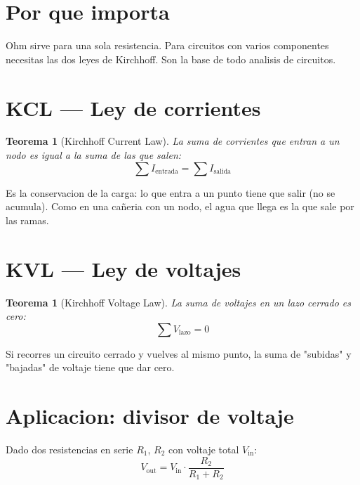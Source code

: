\documentclass[11pt,a4paper,oneside,openright]{book}
\newtheorem{teorema}[definicion]{Teorema}
\begin{document}
\section{Por que importa}

Ohm sirve para una sola resistencia. Para circuitos con varios componentes
necesitas las dos leyes de Kirchhoff. Son la base de todo analisis de
circuitos.

\section{KCL --- Ley de corrientes}

\begin{teorema}[Kirchhoff Current Law]
La suma de corrientes que entran a un nodo es igual a la suma de las que
salen:
\begin{equation}
\sum I_{\text{entrada}} = \sum I_{\text{salida}}
\end{equation}
\end{teorema}

\begin{intuibox}
Es la conservacion de la carga: lo que entra a un punto tiene que salir
(no se acumula). Como en una cañeria con un nodo, el agua que llega es la
que sale por las ramas.
\end{intuibox}

\section{KVL --- Ley de voltajes}

\begin{teorema}[Kirchhoff Voltage Law]
La suma de voltajes en un lazo cerrado es cero:
\begin{equation}
\sum V_{\text{lazo}} = 0
\end{equation}
\end{teorema}

\begin{intuibox}
Si recorres un circuito cerrado y vuelves al mismo punto, la suma de
"subidas" y "bajadas" de voltaje tiene que dar cero.
\end{intuibox}

\section{Aplicacion: divisor de voltaje}

Dado dos resistencias en serie $R_1$, $R_2$ con voltaje total $V_{\text{in}}$:
\begin{equation}
V_{\text{out}} = V_{\text{in}} \cdot \frac{R_2}{R_1 + R_2}
\end{equation}
\end{document}
